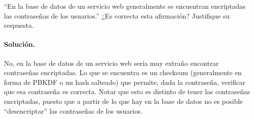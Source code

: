 ``En la base de datos de un servicio web generalmente se encuentran
encriptadas las contraseñas de los usuarios.'' ¿Es correcta esta
afirmación? Justifique su respuesta.

\paragraph{Solución.} No, en la base de datos de un servicio web sería muy extraño encontrar contraseñas encriptadas. Lo que se encuentra es un checksum (generalmente en forma de PBKDF o un hash salteado) que permite, dada la contraseña, verificar que esa contraseña es correcta. Notar que esto es distinto de tener las contraseñas encriptadas, puesto que a partir de lo que hay en la base de datos no es posible ``desencriptar'' las contraseñas de los usuarios. 

